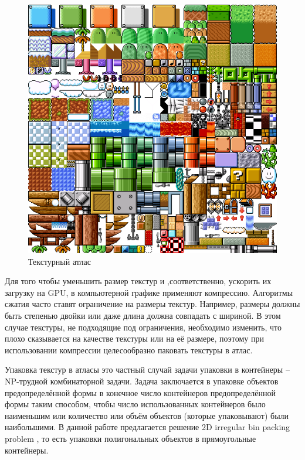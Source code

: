 \documentclass{fefu_thesis/cls/fefu}
\begin{document}
    \begin{figure}[H]
        \centering
        \includegraphics[scale=0.25]{images/texture_atlas_example.png}
        \caption{Текстурный атлас}
    \end{figure}

    Для того чтобы уменьшить размер текстур и ,соответственно, ускорить их загрузку на GPU, в компьютерной графике применяют компрессию. Алгоритмы сжатия часто ставят ограничение на размеры текстур. Например, размеры должны быть степенью двойки или даже длина должна совпадать с шириной. В этом случае текстуры, не подходящие под ограничения, необходимо изменить, что плохо сказывается на качестве текстуры или на её размере, поэтому при использовании компрессии целесообразно паковать текстуры в атлас.

    Упаковка текстур в атласы это частный случай задачи упаковки в контейнеры -- NP-трудной \cite{BinPackingIsNPHard} комбинаторной задачи. Задача заключается в упаковке объектов предопределённой формы в конечное число контейнеров предопределённой формы таким способом, чтобы число использованных контейнеров было наименьшим или количество или объём объектов (которые упаковывают) были наибольшими. В данной работе предлагается решение 2D irregular bin packing problem \cite{TypologyOfPackingProblems}, то есть упаковки полигональных объектов в прямоугольные контейнеры.
\end{document}
